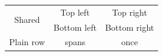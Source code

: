 \documentclass{article}
\begin{document}
\begin{tabular}{|c|c|c|}
\hline
\multirow{2}{*}{Shared} & Top left & Top right \\
& Bottom left & Bottom right \\
\hline
Plain row & spans & once \\
\hline
\end{tabular}
\end{document}
